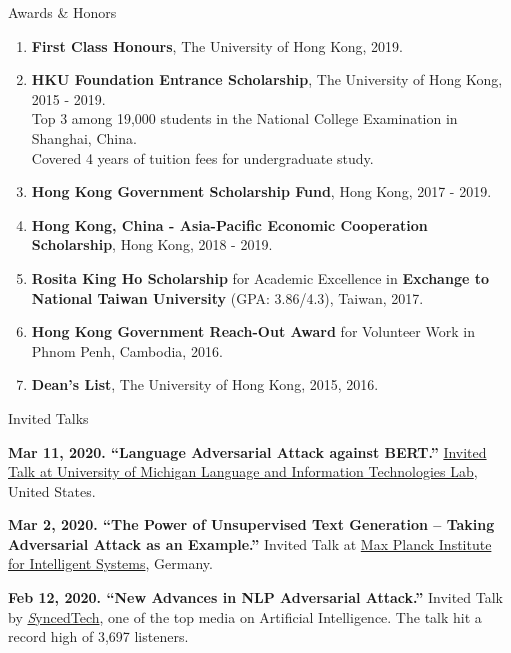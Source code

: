 \documentclass{resume} %
\begin{document}
\begin{rSection}{Awards \& Honors} \itemsep -2pt
\begin{enumerate}
  \item \textbf{First Class Honours}, The University of Hong Kong, 2019.
  \item \textbf{HKU Foundation Entrance Scholarship}, The University of Hong Kong, 2015 - 2019.
  \\Top 3 among 19,000 students in the National College Examination in Shanghai, China. \\Covered 4 years of tuition fees for undergraduate study.
  \item \textbf{Hong Kong Government Scholarship Fund}, Hong Kong, 2017 - 2019.
  \item \textbf{Hong Kong, China - Asia-Pacific Economic Cooperation Scholarship}, Hong Kong, 2018 - 2019.
  \item \textbf{Rosita King Ho Scholarship} for Academic Excellence in \textbf{Exchange to National Taiwan University} (GPA: 3.86/4.3), Taiwan, 2017.
  \item \textbf{Hong Kong Government Reach-Out Award} for Volunteer Work in Phnom Penh, Cambodia, 2016.
  \item \textbf{Dean's List}, The University of Hong Kong, 2015, 2016.
\end{enumerate}

\end{rSection}



\begin{rSection}{Invited Talks}


{\bf Mar 11, 2020.  ``Language Adversarial Attack against BERT.''} \href{https://lit.eecs.umich.edu/}{Invited Talk at University of Michigan Language and Information Technologies Lab}, United States. 

{\bf Mar 2, 2020. ``The Power of Unsupervised Text Generation -- Taking Adversarial Attack as an Example.''} Invited Talk at \href{https://is.mpg.de/}{Max Planck Institute for Intelligent Systems}, Germany. 

{\bf Feb 12, 2020. ``New Advances in NLP Adversarial Attack.''}  Invited Talk by \href{https://syncedreview.com/}{\emph SyncedTech}, one of the top media on Artificial Intelligence. The talk hit a record high of 3,697 listeners.

\end{rSection}
\end{document}
